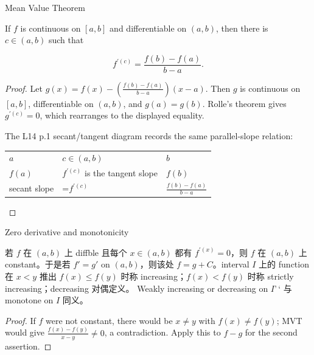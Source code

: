 \begin{corollary}{Mean Value Theorem}

If \(f\) is continuous on \(\left\lbrack {a,b} \right\rbrack\) and differentiable on \(\left( {a,b} \right)\), then there is \(c \in \left( {a,b} \right)\) such that

\[f^{'{(c)}} = \frac{f(b) - f(a)}{b - a}.\]

\end{corollary}

\begin{proof}

Let \(g(x) = f(x) - \left( \frac{f(b) - f(a)}{b - a} \right)\left( {x - a} \right)\). Then \(g\) is continuous on \(\left\lbrack {a,b} \right\rbrack\), differentiable on \(\left( {a,b} \right)\), and \(g(a) = g(b)\). Rolle's theorem gives \(g^{'{(c)}} = 0\), which rearranges to the displayed equality.

The L14 p.1 secant/tangent diagram records the same parallel-slope relation:

{\def\LTcaptype{none} %
\begin{longtable}[]{@{}lll@{}}
\toprule\noalign{}
\endhead
\bottomrule\noalign{}
\endlastfoot
\(a\) & \(c \in \left( {a,b} \right)\) & \(b\) \\
\(f(a)\) & \(f^{'{(c)}}\) is the tangent slope & \(f(b)\) \\
secant slope & =\(f^{'{(c)}}\) & \(\frac{f(b) - f(a)}{b - a}\) \\
\end{longtable}
}

\end{proof}

\begin{corollary}{Zero derivative and monotonicity}

若 \(f\) 在 \(\left( {a,b} \right)\) 上 diffble 且每个 \(x \in \left( {a,b} \right)\) 都有 \(f^{'{(x)}} = 0\)，则 \(f\) 在 \(\left( {a,b} \right)\) 上 constant。于是若 \(f' = g'\) on \(\left( {a,b} \right)\)，则该处 \(f = g + C\)。interval \(I\) 上的 function 在 \(x < y\) 推出 \(f(x) \leq f(y)\) 时称 increasing；\(f(x) < f(y)\) 时称 strictly increasing；decreasing 对偶定义。 Weakly increasing or decreasing on \(I\)'\,` 与 monotone on \(I\) 同义。

\end{corollary}

\begin{proof}

If \(f\) were not constant, there would be \(x \neq y\) with \(f(x) \neq f(y)\); MVT would give \(\frac{f(x) - f(y)}{x - y} \neq 0\), a contradiction. Apply this to \(f - g\) for the second assertion.

\end{proof}

